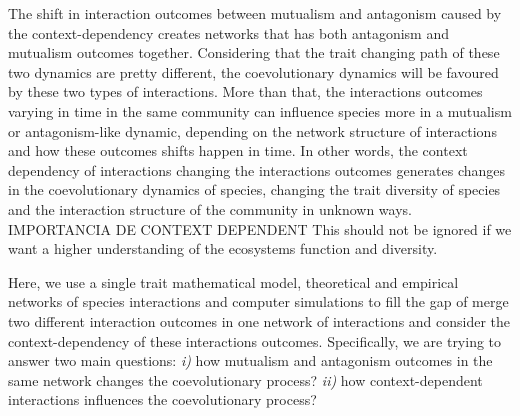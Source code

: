 \documentclass[a4paper, 12pt]{article}
\begin{document}
The shift in interaction outcomes between mutualism and antagonism caused by the context-dependency creates networks that has both antagonism and mutualism outcomes together. Considering that the trait changing path of these two dynamics are pretty different, the coevolutionary dynamics will be favoured by these two types of interactions. More than that, the interactions outcomes varying in time in the same community can influence species more in a mutualism or antagonism-like dynamic, depending on the network structure of interactions and how these outcomes shifts happen in time. In other words, the context dependency of interactions changing the interactions outcomes generates changes in the coevolutionary dynamics of species, changing the trait diversity of species and the interaction structure of the community in unknown ways. IMPORTANCIA DE CONTEXT DEPENDENT This should not be ignored if we want a higher understanding of the ecosystems function and diversity. 

Here, we use a single trait mathematical model, theoretical and empirical networks of species interactions and computer simulations to fill the gap of merge two different interaction outcomes in one network of interactions and consider the context-dependency of these interactions outcomes. Specifically, we are trying to answer two main questions: \textit{i)} how mutualism and antagonism outcomes in the same network changes the coevolutionary process? \textit{ii)} how context-dependent interactions influences the coevolutionary process?
\end{document}
